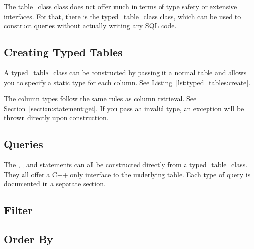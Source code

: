 The \gls{table_class} class does not offer much in terms of type safety or extensive interfaces. For that, there is the \gls{typed_table_class} class, which can be used to construct queries without actually writing any SQL code.

\subsection{Creating Typed Tables}
\label{section:typed_tables:create}

A \gls{typed_table_class} can be constructed by passing it a normal table and allows you to specify a static type for each column. See Listing~\ref{lst:typed_tables:create}.



The column types follow the same rules as column retrieval. See Section~\ref{section:statement:get}. If you pass an invalid type, an exception will be thrown directly upon construction.

\subsection{Queries}
\label{section:typed_tables:queries}

The , ,  and  statements can all be constructed directly from a \gls{typed_table_class}. They all offer a C++ only interface to the underlying table. Each type of query is documented in a separate section.


\subsection{Filter}

\subsection{Order By}


